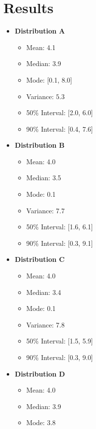 \documentclass[12pt]{article}
\begin{document}
\section{Results}

\begin{multicols}{2}
    \begin{itemize}
        \item \textbf{Distribution A}
        \begin{itemize}
            \item Mean: 4.1
            \item Median: 3.9
            \item Mode: [0.1, 8.0]
            \item Variance: \(5.3\)
            \item 50\% Interval: [2.0, 6.0]
            \item 90\% Interval: [0.4, 7.6]
        \end{itemize}
        \item \textbf{Distribution B}
        \begin{itemize}
            \item Mean: 4.0
            \item Median: 3.5
            \item Mode: 0.1
            \item Variance: 7.7
            \item 50\% Interval: [1.6, 6.1]
            \item 90\% Interval: [0.3, 9.1]
        \end{itemize}
        \item \textbf{Distribution C}
        \begin{itemize}
            \item Mean: 4.0
            \item Median: 3.4
            \item Mode: 0.1
            \item Variance: 7.8
            \item 50\% Interval: [1.5, 5.9]
            \item 90\% Interval: [0.3, 9.0]
        \end{itemize}
        \item \textbf{Distribution D}
        \begin{itemize}
            \item Mean: 4.0
            \item Median: 3.9
            \item Mode: 3.8

\end{itemize}
\end{itemize}
\end{multicols}
\end{document}
